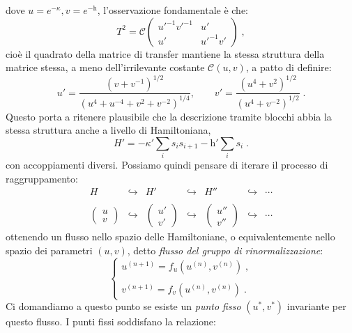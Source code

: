 \documentclass[12pt,a4paper]{article}
\theoremstyle{definition}
\numberwithin{equation}{section}
\begin{document}
dove $u=e^{-\kappa},v=e^{-\mathrm{h}}$, l'osservazione fondamentale è che:
\begin{equation}
T^2=\mathcal{C}\left(\begin{matrix}
u'^{-1}v'^{-1} & u' \\
u' & u'^{-1}v'
\end{matrix}\right)\;,
\end{equation}
cioè il quadrato della matrice di transfer mantiene la stessa struttura della matrice stessa, a meno dell'irrilevante costante $\mathcal{C}(u,v)$, a patto di definire:
\begin{equation}
u'=\frac{(v+v^{-1})^{1/2}}{(u^4+u^{-4}+v^2+v^{-2})^{1/4}},\qquad v'=\frac{(u^4+v^2)^{1/2}}{(u^4+v^{-2})^{1/2}}\;.
\end{equation}
Questo porta a ritenere plausibile che la descrizione tramite blocchi abbia la stessa struttura anche a livello di Hamiltoniana,
$$
H'=-\kappa'\sum_is_is_{i+1}-\mathrm{h}'\sum_is_i\;.
$$
con accoppiamenti diversi. Possiamo quindi pensare di iterare il processo di raggruppamento:
$$
\begin{matrix}
H &\hookrightarrow &  H' & \hookrightarrow & H'' & \hookrightarrow & \cdots \\
& & & & & & \\
\left(\begin{matrix}
u \\
v
\end{matrix}\right) & \hookrightarrow & \left(\begin{matrix}
u' \\
v'
\end{matrix}\right) &  \hookrightarrow & \left(\begin{matrix}
u'' \\
v''
\end{matrix}\right) & \hookrightarrow & \cdots
\end{matrix}
$$
ottenendo un flusso nello spazio delle Hamiltoniane, o equivalentemente nello spazio dei parametri $(u,v)$, detto \emph{flusso del gruppo di rinormalizzazione}:
\begin{equation}
\begin{cases}
u^{(n+1)}=f_u(u^{(n)},v^{(n)})\;, \\
\\
v^{(n+1)}=f_v(u^{(n)},v^{(n)})\;.
\end{cases}
\end{equation}
Ci domandiamo a questo punto se esiste un \emph{punto fisso} $(u^*,v^*)$ invariante per questo flusso. I punti fissi soddisfano la relazione:
\end{document}
